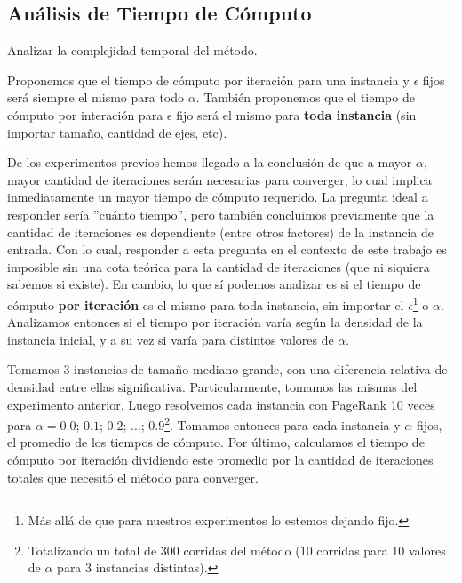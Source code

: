 \subsection{An\'alisis de Tiempo de C\'omputo}
\label{subsec:exp4}
\begin{LaTeXdescription}
    \item[Objetivo] Analizar la complejidad temporal del m\'etodo.\\

    \item[Hip\'otesis] Proponemos que el tiempo de c\'omputo por iteraci\'on
        para una instancia y $\epsilon$ fijos ser\'a siempre el mismo para todo
        $\alpha$. Tambi\'en proponemos que el tiempo de c\'omputo por interación
        para $\epsilon$ fijo ser\'a el mismo para \textbf{toda instancia} (sin
        importar tama\~no, cantidad de ejes, etc).\\

    \item[Proposici\'on] De los experimentos previos hemos llegado a la
        conclusi\'on de que a mayor $\alpha$, mayor cantidad de iteraciones
        ser\'an necesarias para converger, lo cual implica inmediatamente un
        mayor tiempo de c\'omputo requerido. La pregunta ideal a responder
        ser\'ia ''cu\'anto tiempo'', pero tambi\'en concluimos previamente que
        la cantidad de iteraciones es dependiente (entre otros factores) de la
        instancia de entrada. Con lo cual, responder a esta pregunta en el
        contexto de este trabajo es imposible sin una cota te\'orica para la
        cantidad de iteraciones (que ni siquiera sabemos si existe). En cambio,
        lo que s\'i podemos analizar es si el tiempo de c\'omputo \textbf{por
        iteraci\'on} es el mismo para toda instancia, sin importar el
        $\epsilon$\footnote{M\'as all\'a de que para nuestros experimentos lo
        estemos dejando fijo.} o $\alpha$. Analizamos entonces si el tiempo por
        iteraci\'on var\'ia seg\'un la densidad de la instancia inicial, y a su
        vez si varía para distintos valores de $\alpha$.\\

    \item[M\'etodo de Experimentaci\'on] Tomamos 3 instancias de tama\~no
        mediano-grande, con una diferencia relativa de densidad entre ellas
        significativa. Particularmente, tomamos las mismas del experimento
        anterior. Luego resolvemos cada instancia con PageRank 10 veces para
        $\alpha=0.0$; $0.1$; $0.2$; $\dots$; $0.9$\footnote{Totalizando un total
        de 300 corridas del m\'etodo (10 corridas para 10 valores de $\alpha$
        para 3 instancias distintas).}. Tomamos entonces para cada instancia y
        $\alpha$ fijos, el promedio de los tiempos de c\'omputo. Por \'ultimo,
        calculamos el tiempo de c\'omputo por iteraci\'on dividiendo este
        promedio por la cantidad de iteraciones totales que necesit\'o el
        m\'etodo para converger.\\

    \item[Resultados, an\'alisis y discusi\'on]
\end{LaTeXdescription}

